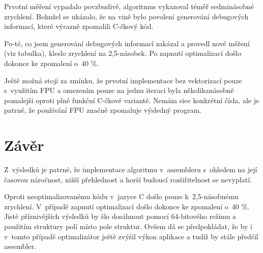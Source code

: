 \documentclass[11pt,a4paper,onecolumn,notitlepage]{article}
\begin{document}
		\vspace*{1em}
		Prvotní měření vypadalo povzbudivě, algoritmus vykazoval téměř sedminásobné zrychlení. Bohužel se ukázalo, že na vině bylo povolení generování debugových informací, které výrazně zpomalili C-čkový kód.
		
		Po-té, co jsem generování debugových informací zakázal a provedl nové měření (viz tabulka), kleslo zrychlení na 2,5-násobek. Po zapnutí optimalizací došlo dokonce ke zpomalení o~40 \%.
	
		Ještě možná stojí za zmínku, že prvotní implementace bez vektorizací pouze s~využitím FPU a omezením pouze na jednu iteraci byla několikanásobně pomalejší oproti plně funkční C-čkové variantě. Nemám sice konkrétní čísla, ale je patrné, že používání FPU značně zpomaluje výsledný program.
	
	
\section{Závěr}
	Z~výsledků je patrné, že implementace algoritmu v~assembleru s~ohledem na její časovou náročnost, nižší přehlednost a horší budoucí rozšiřitelnost se nevyplatí.
	
	Oproti neoptimalizovanému kódu v~jazyce C došlo pouze k~2,5-násobnému zrychlení. V~případě zapnutí optimalizací došlo dokonce ke zpomalení o~40 \%. Jistě příznivějších výsledků by šlo dosáhnout pomocí 64-bitového režimu a použitím struktury polí místo pole struktur. Ovšem dá se předpokládat, že by i v~tomto případě optimalizátor ještě zvýšil výkon aplikace a tudíž by stále předčil assembler.
	

\newpage


\end{document}
